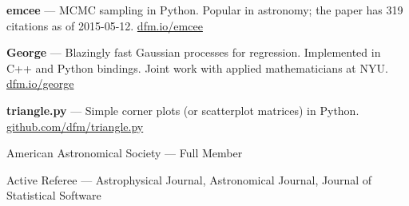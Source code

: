 \documentclass[12pt,letterpaper]{article}
\begin{document}
\begin{list}{}{\cvlist}

\item {\bf emcee} ---
    MCMC sampling in Python. Popular in astronomy; the paper has 319 citations
    as of 2015-05-12. \url{dfm.io/emcee}

\item {\bf George} ---
    Blazingly fast Gaussian processes for regression. Implemented in C++ and
    Python bindings. Joint work with applied mathematicians at NYU.
    \url{dfm.io/george}

\item {\bf triangle.py} ---
    Simple corner plots (or scatterplot matrices) in Python.
    \url{github.com/dfm/triangle.py}


\end{list}


\begin{list}{}{\cvlist}
\item American Astronomical Society --- Full Member
\item Active Referee --- Astrophysical Journal, Astronomical Journal,
    Journal of Statistical Software
\end{list}
\end{document}
